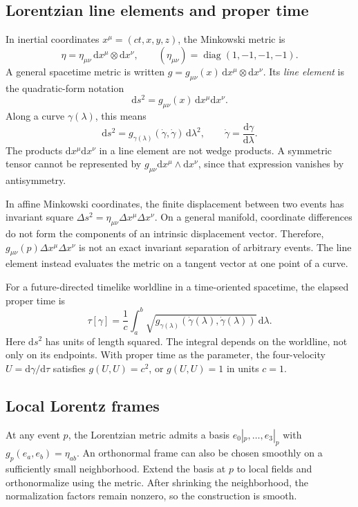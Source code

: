 \documentclass[11pt,a4paper]{article}
\numberwithin{equation}{section}
\newcommand{\dd}{\mathrm d}
\begin{document}
\subsection{Lorentzian line elements and proper time}

In inertial coordinates \(x^\mu=(ct,x,y,z)\), the Minkowski metric is
\[
 \eta=\eta_{\mu\nu}\,\dd x^\mu\otimes\dd x^\nu,
 \qquad (\eta_{\mu\nu})=\operatorname{diag}(1,-1,-1,-1).
\]
A general spacetime metric is written
\(g=g_{\mu\nu}(x)\,\dd x^\mu\otimes\dd x^\nu\). Its
\emph{line element} is the quadratic-form notation
\begin{equation}
 \dd s^2=g_{\mu\nu}(x)\,\dd x^\mu\dd x^\nu.
 \label{eq:line-element}
\end{equation}
Along a curve \(\gamma(\lambda)\), this means
\[
 \dd s^2=g_{\gamma(\lambda)}(\dot\gamma,\dot\gamma)\,\dd\lambda^2,
 \qquad \dot\gamma=\frac{\dd\gamma}{\dd\lambda}.
\]
The products \(\dd x^\mu\dd x^\nu\) in a line element are not wedge
products. A symmetric tensor cannot be represented by
\(g_{\mu\nu}\dd x^\mu\wedge\dd x^\nu\), since that expression
vanishes by antisymmetry.

In affine Minkowski coordinates, the finite displacement between two
events has invariant square
\(\Delta s^2=\eta_{\mu\nu}\Delta x^\mu\Delta x^\nu\).
On a general manifold, coordinate differences do not form the
components of an intrinsic displacement vector. Therefore,
\(g_{\mu\nu}(p)\Delta x^\mu\Delta x^\nu\) is not an exact invariant
separation of arbitrary events. The line element instead evaluates
the metric on a tangent vector at one point of a curve.

For a future-directed timelike worldline in a time-oriented spacetime,
the elapsed proper time is
\begin{equation}
 \tau[\gamma]=\frac1c\int_a^b
 \sqrt{g_{\gamma(\lambda)}(\dot\gamma(\lambda),\dot\gamma(\lambda))}
 \,\dd\lambda.
 \label{eq:proper-time}
\end{equation}
Here \(\dd s^2\) has units of length squared. The integral depends on
the worldline, not only on its endpoints. With proper time as the
parameter, the four-velocity \(U=\dd\gamma/\dd\tau\) satisfies
\(g(U,U)=c^2\), or \(g(U,U)=1\) in units \(c=1\).

\subsection{Local Lorentz frames}
\label{sec:local-lorentz}

At any event \(p\), the Lorentzian metric admits a basis
\(e_0|_p,\ldots,e_3|_p\) with \(g_p(e_a,e_b)=\eta_{ab}\).
An orthonormal frame can also be chosen smoothly on a sufficiently
small neighborhood. Extend the basis at \(p\) to local fields and
orthonormalize using the metric. After shrinking the neighborhood,
the normalization factors remain nonzero, so the construction is smooth.
\end{document}
